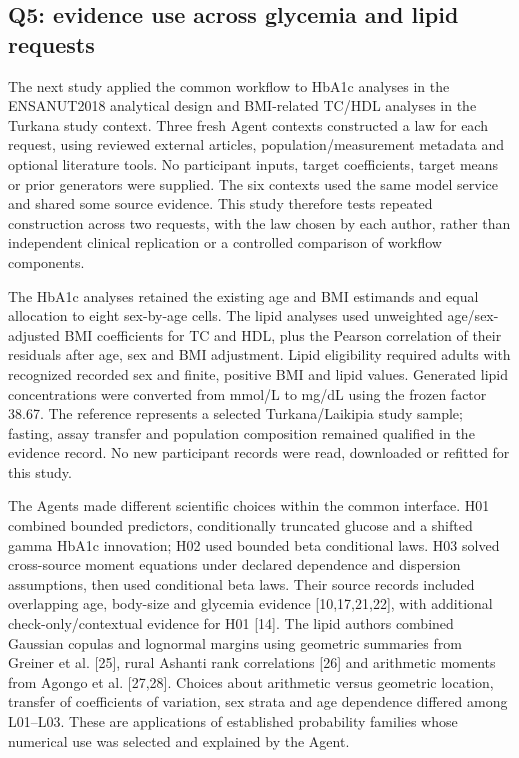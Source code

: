 \documentclass[10pt,twocolumn]{article}
\begin{document}
\subsection{Q5: evidence use across glycemia and lipid requests}

The next study applied the common workflow to HbA1c analyses in the ENSANUT2018 analytical design and BMI-related TC/HDL analyses in the Turkana study context. Three fresh Agent contexts constructed a law for each request, using reviewed external articles, population/measurement metadata and optional literature tools. No participant inputs, target coefficients, target means or prior generators were supplied. The six contexts used the same model service and shared some source evidence. This study therefore tests repeated construction across two requests, with the law chosen by each author, rather than independent clinical replication or a controlled comparison of workflow components.


The HbA1c analyses retained the existing age and BMI estimands and equal allocation to eight sex-by-age cells. The lipid analyses used unweighted age/sex-adjusted BMI coefficients for TC and HDL, plus the Pearson correlation of their residuals after age, sex and BMI adjustment. Lipid eligibility required adults with recognized recorded sex and finite, positive BMI and lipid values. Generated lipid concentrations were converted from mmol/L to mg/dL using the frozen factor 38.67. The reference represents a selected Turkana/Laikipia study sample; fasting, assay transfer and population composition remained qualified in the evidence record. No new participant records were read, downloaded or refitted for this study.


The Agents made different scientific choices within the common interface. H01 combined bounded predictors, conditionally truncated glucose and a shifted gamma HbA1c innovation; H02 used bounded beta conditional laws. H03 solved cross-source moment equations under declared dependence and dispersion assumptions, then used conditional beta laws. Their source records included overlapping age, body-size and glycemia evidence [10,17,21,22], with additional check-only/contextual evidence for H01 [14]. The lipid authors combined Gaussian copulas and lognormal margins using geometric summaries from Greiner et al. [25], rural Ashanti rank correlations [26] and arithmetic moments from Agongo et al. [27,28]. Choices about arithmetic versus geometric location, transfer of coefficients of variation, sex strata and age dependence differed among L01–L03. These are applications of established probability families whose numerical use was selected and explained by the Agent.
\end{document}
